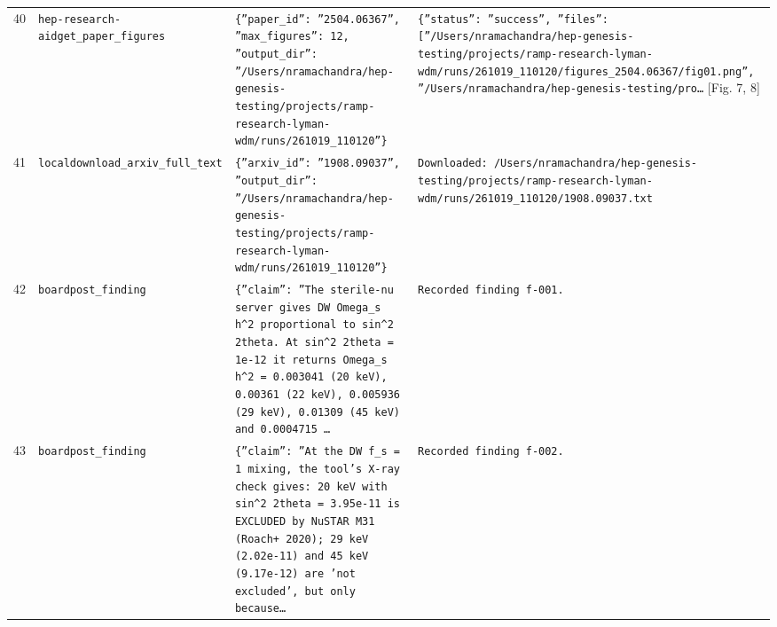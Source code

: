 \documentclass[11pt,a4paper]{article}
\begin{document}
\begin{longtable}{@{}p{}p{}p{}p{}@{}}
40 & \texttt{hep-research-aid}\newline\texttt{get\_\allowbreak{}paper\_\allowbreak{}figures} & \texttt{\{''paper\_\allowbreak{}id'':\allowbreak{} ''2504.06367'',\allowbreak{} ''max\_\allowbreak{}figures'':\allowbreak{} 12,\allowbreak{} ''output\_\allowbreak{}dir'':\allowbreak{} ''/\allowbreak{}Users/\allowbreak{}nramachandra/\allowbreak{}hep-genesis-testing/\allowbreak{}projects/\allowbreak{}ramp-research-lyman-wdm/\allowbreak{}runs/\allowbreak{}261019\_\allowbreak{}110120''\}\allowbreak{}} & \texttt{\{''status'':\allowbreak{} ''success'',\allowbreak{} ''files'':\allowbreak{} [''/\allowbreak{}Users/\allowbreak{}nramachandra/\allowbreak{}hep-genesis-testing/\allowbreak{}projects/\allowbreak{}ramp-research-lyman-wdm/\allowbreak{}runs/\allowbreak{}261019\_\allowbreak{}110120/\allowbreak{}figures\_\allowbreak{}2504.06367/\allowbreak{}fig01.png'',\allowbreak{} ''/\allowbreak{}Users/\allowbreak{}nramachandra/\allowbreak{}hep-genesis-testing/\allowbreak{}pro\ldots{}\allowbreak{}} [Fig. 7, 8] \\
41 & \texttt{local}\newline\texttt{download\_\allowbreak{}arxiv\_\allowbreak{}full\_\allowbreak{}text} & \texttt{\{''arxiv\_\allowbreak{}id'':\allowbreak{} ''1908.09037'',\allowbreak{} ''output\_\allowbreak{}dir'':\allowbreak{} ''/\allowbreak{}Users/\allowbreak{}nramachandra/\allowbreak{}hep-genesis-testing/\allowbreak{}projects/\allowbreak{}ramp-research-lyman-wdm/\allowbreak{}runs/\allowbreak{}261019\_\allowbreak{}110120''\}\allowbreak{}} & \texttt{Downloaded:\allowbreak{} /\allowbreak{}Users/\allowbreak{}nramachandra/\allowbreak{}hep-genesis-testing/\allowbreak{}projects/\allowbreak{}ramp-research-lyman-wdm/\allowbreak{}runs/\allowbreak{}261019\_\allowbreak{}110120/\allowbreak{}1908.09037.txt} \\
42 & \texttt{board}\newline\texttt{post\_\allowbreak{}finding} & \texttt{\{''claim'':\allowbreak{} ''The sterile-nu server gives DW Omega\_\allowbreak{}s h\textasciicircum{}\allowbreak{}2 proportional to sin\textasciicircum{}\allowbreak{}2 2theta. At sin\textasciicircum{}\allowbreak{}2 2theta =\allowbreak{} 1e-12 it returns Omega\_\allowbreak{}s h\textasciicircum{}\allowbreak{}2 =\allowbreak{} 0.003041 (20 keV)\allowbreak{},\allowbreak{} 0.00361 (22 keV)\allowbreak{},\allowbreak{} 0.005936 (29 keV)\allowbreak{},\allowbreak{} 0.01309 (45 keV)\allowbreak{} and 0.0004715 \ldots{}\allowbreak{}} & \texttt{Recorded finding f-001.} \\
43 & \texttt{board}\newline\texttt{post\_\allowbreak{}finding} & \texttt{\{''claim'':\allowbreak{} ''At the DW f\_\allowbreak{}s =\allowbreak{} 1 mixing,\allowbreak{} the tool's X-ray check gives:\allowbreak{} 20 keV with sin\textasciicircum{}\allowbreak{}2 2theta =\allowbreak{} 3.95e-11 is EXCLUDED by NuSTAR M31 (Roach+ 2020)\allowbreak{};\allowbreak{} 29 keV (2.02e-11)\allowbreak{} and 45 keV (9.17e-12)\allowbreak{} are 'not excluded',\allowbreak{} but only because\ldots{}\allowbreak{}} & \texttt{Recorded finding f-002.} \\

\end{longtable}
\end{document}
